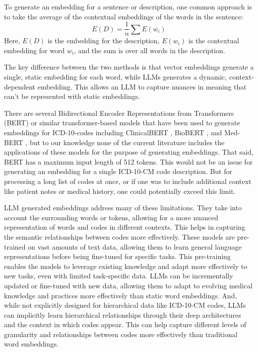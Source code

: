 \documentclass{bmcart}
\begin{document}
To generate an embedding for a sentence or description, one common approach is to take the average of the contextual embeddings of the words in the sentence:
\begin{equation*}
E(D) = \frac{1}{n } \sum E(w_i)
\end{equation*}
Here, $E(D)$ is the embedding for the description, $E(w_i)$ is the contextual 
embedding for word $w_i$, and the sum is over all words in the description.

The key difference between the two methods is that vector embeddings generate 
a single, static embedding for each word, while LLMs generates a dynamic, 
context-dependent embedding. This allows an LLM to capture nuances in meaning 
that can't be represented with static embeddings.

There are several Bidirectional Encoder Representations from Transformers 
(BERT) or similar transformer-based models that have been used 
to generate embeddings for ICD-10-codes including ClinicalBERT 
\cite{huang2019,alsentzer2019}, BioBERT \cite{lee2020}, and
Med-BERT \cite{rasmy2021}, but to our knowledge none of the current 
literature includes the 
applications of these models for the purpose of generating embeddings. That 
said, BERT has a maximum input length of 512 tokens. This would not be an 
issue for generating an embedding for a single ICD-10-CM code description. But 
for processing a long list of codes at once, or if one was to include 
additional context like patient notes or medical history, one could potentially 
exceed this limit.

LLM generated embeddings address many of these limitations. They take into 
account the surrounding words or tokens, allowing for a more nuanced 
representation of words and codes in different contexts. This helps in 
capturing the semantic relationships between codes more effectively. These 
models are pre-trained on vast amounts of text data, allowing them to learn 
general language representations before being fine-tuned for specific tasks. 
This pre-training enables the models to leverage existing knowledge and 
adapt more effectively to new tasks, even with limited task-specific data. 
LLMs can be incrementally updated or fine-tuned with new data, allowing them 
to adapt to evolving medical knowledge and practices more effectively than 
static word embeddings. And, while not explicitly designed for hierarchical 
data like ICD-10-CM codes, LLMs can implicitly learn hierarchical 
relationships through their deep architectures and the context in which codes 
appear. This can help capture different levels of granularity and relationships between codes more effectively than traditional word embeddings.
\end{document}
